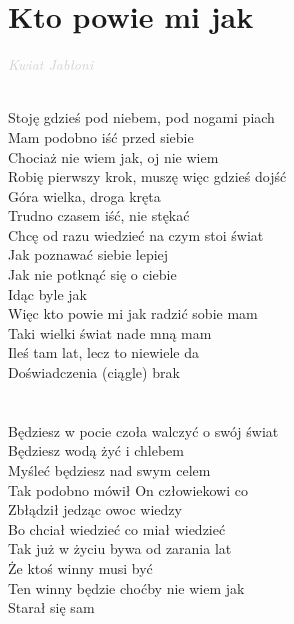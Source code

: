 \documentclass[a5paper, 10pt]{book}
\begin{document}
\newpage
\section{Kto powie mi jak}\textcolor{lightgray}{\textit{Kwiat Jabłoni}}\\~\\
\begin{minipage}[t]{0.8\textwidth}
Stoję gdzieś pod niebem, pod nogami piach\\
Mam podobno iść przed siebie\\
Chociaż nie wiem jak, oj nie wiem\\
Robię pierwszy krok, muszę więc gdzieś dojść\\
Góra wielka, droga kręta\\
Trudno czasem iść, nie stękać\\
Chcę od razu wiedzieć na czym stoi świat\\
Jak poznawać siebie lepiej\\
Jak nie potknąć się o ciebie\\
Idąc byle jak\\

\hspace*{5mm}Więc kto powie mi jak radzić sobie mam \\
\hspace*{5mm}Taki wielki świat nade mną mam \\
\hspace*{5mm}Ileś tam lat, lecz to niewiele da\\
\hspace*{5mm}Doświadczenia (ciągle) brak\\
\\
\\
Będziesz w pocie czoła walczyć o swój świat\\
Będziesz wodą żyć i chlebem\\
Myśleć będziesz nad swym celem\\
Tak podobno mówił On człowiekowi co\\
Zbłądził jedząc owoc wiedzy\\
Bo chciał wiedzieć co miał wiedzieć\\
Tak już w życiu bywa od zarania lat\\
Że ktoś winny musi być\\
Ten winny będzie choćby nie wiem jak\\
Starał się sam\\
\end{minipage}
\end{document}
